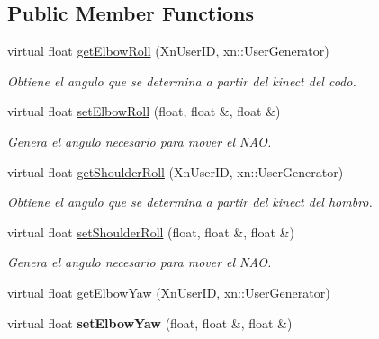 \subsection*{Public Member Functions}
\begin{DoxyCompactItemize}
\item 
virtual float \hyperlink{class_l_arm_aca3aa8c68dedd1c7fb1e0ed9ba55b239}{get\-Elbow\-Roll} (Xn\-User\-I\-D, xn\-::\-User\-Generator)
\begin{DoxyCompactList}\small\item\em Obtiene el angulo que se determina a partir del kinect del codo. \end{DoxyCompactList}\item 
\hypertarget{class_l_arm_a19580475d6f1d5ae421a419a090f835e}{virtual float \hyperlink{class_l_arm_a19580475d6f1d5ae421a419a090f835e}{set\-Elbow\-Roll} (float, float \&, float \&)}\label{class_l_arm_a19580475d6f1d5ae421a419a090f835e}

\begin{DoxyCompactList}\small\item\em Genera el angulo necesario para mover el N\-A\-O. \end{DoxyCompactList}\item 
\hypertarget{class_l_arm_a25b46c7a95c135f5020800b78a28d24a}{virtual float \hyperlink{class_l_arm_a25b46c7a95c135f5020800b78a28d24a}{get\-Shoulder\-Roll} (Xn\-User\-I\-D, xn\-::\-User\-Generator)}\label{class_l_arm_a25b46c7a95c135f5020800b78a28d24a}

\begin{DoxyCompactList}\small\item\em Obtiene el angulo que se determina a partir del kinect del hombro. \end{DoxyCompactList}\item 
\hypertarget{class_l_arm_ada7589a6dabadd906736f76e9d71d9c5}{virtual float \hyperlink{class_l_arm_ada7589a6dabadd906736f76e9d71d9c5}{set\-Shoulder\-Roll} (float, float \&, float \&)}\label{class_l_arm_ada7589a6dabadd906736f76e9d71d9c5}

\begin{DoxyCompactList}\small\item\em Genera el angulo necesario para mover el N\-A\-O. \end{DoxyCompactList}\item 
virtual float \hyperlink{class_l_arm_a45c25b7614431e4a3e39bfcf977a3de7}{get\-Elbow\-Yaw} (Xn\-User\-I\-D, xn\-::\-User\-Generator)
\item 
\hypertarget{class_l_arm_a536c8e6957dfc9e2b8a9d3c0ee3b8f52}{virtual float {\bfseries set\-Elbow\-Yaw} (float, float \&, float \&)}\label{class_l_arm_a536c8e6957dfc9e2b8a9d3c0ee3b8f52}

\end{DoxyCompactItemize}


